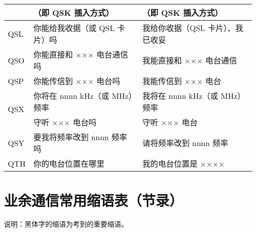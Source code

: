 \begin{longtable}{|l|l|l|}
                         & （即 QSK 插入方式）                      & （即 QSK 插入方式）                      \\
  \hline
  QSL                    & 你能给我收据（或 QSL 卡片）吗                 & 我给你收据（QSL 卡片）、我已收妥                \\
  \hline
  QSO                    & 你能直接和 ××× 电台通信吗                   & 我能直接和 ××× 电台通信                    \\
  \hline
  QSP                    & 你能传信到 ××× 电台吗                     & 我能传信到 ××× 电台                      \\
  \hline
  \multirow{2}{1em}{QSX} & 你将在 nnnn \si{\kHz}（或 \si{\MHz}）频率 & 我将在 nnnn \si{\kHz}（或 \si{\MHz}）频率 \\
                         & 守听 ××× 电台吗                        & 守听 ××× 电台                         \\
  \hline
  QSY                    & 要我将频率改到 nnnn 频率吗                  & 请将频率改到 nnnn 频率                    \\
  \hline
  QTH                    & 你的电台位置在哪里                         & 我的电台位置是 ××××                      \\
  \hline
\end{longtable}

\newpage

\section{业余通信常用缩语表（节录）}

说明：黑体字的缩语为考到的重要缩语。

